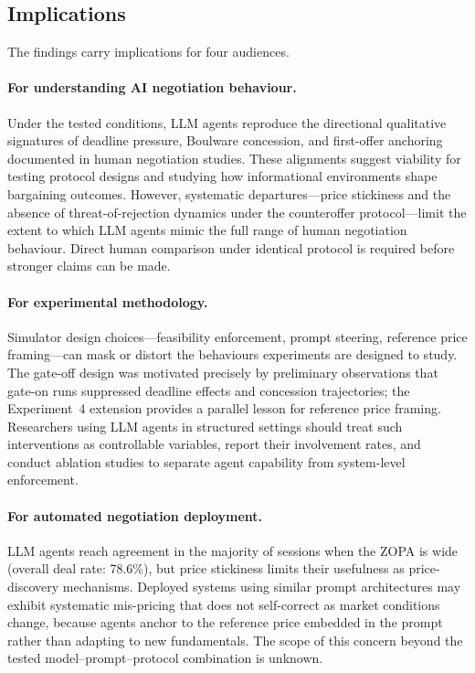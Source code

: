 \subsection{Implications}

The findings carry implications for four audiences.

\paragraph{For understanding AI negotiation behaviour.}
Under the tested conditions, LLM agents reproduce the directional qualitative signatures of deadline pressure, Boulware concession, and first-offer anchoring documented in human negotiation studies.  These alignments suggest viability for testing protocol designs and studying how informational environments shape bargaining outcomes.  However, systematic departures---price stickiness and the absence of threat-of-rejection dynamics under the counteroffer protocol---limit the extent to which LLM agents mimic the full range of human negotiation behaviour.  Direct human comparison under identical protocol is required before stronger claims can be made.

\paragraph{For experimental methodology.}
Simulator design choices---feasibility enforcement, prompt steering, reference price framing---can mask or distort the behaviours experiments are designed to study.  The gate-off design was motivated precisely by preliminary observations that gate-on runs suppressed deadline effects and concession trajectories; the Experiment~4 extension provides a parallel lesson for reference price framing.  Researchers using LLM agents in structured settings should treat such interventions as controllable variables, report their involvement rates, and conduct ablation studies to separate agent capability from system-level enforcement.

\paragraph{For automated negotiation deployment.}
LLM agents reach agreement in the majority of sessions when the ZOPA is wide (overall deal rate: 78.6\%), but price stickiness limits their usefulness as price-discovery mechanisms.  Deployed systems using similar prompt architectures may exhibit systematic mis-pricing that does not self-correct as market conditions change, because agents anchor to the reference price embedded in the prompt rather than adapting to new fundamentals.  The scope of this concern beyond the tested model--prompt--protocol combination is unknown.

